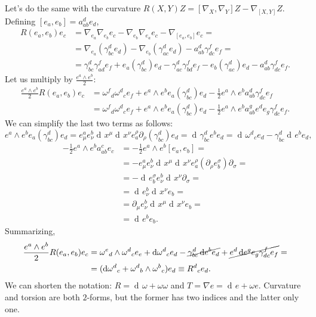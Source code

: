 \documentclass[a4paper,12pt]{book}
\newcommand{\dd}{\mathop{\mathrm{d}\!}{}}
\theoremstyle{definition}
\theoremstyle{remark}
\begin{document}
Let's do the same with the curvature $R(X,Y)Z=[\nabla_X,\nabla_Y]Z-\nabla_{[X,Y]}Z$. Defining $[e_a,e_b]=a_{ab}^de_d$,
\begin{align*}
R(e_a,e_b)e_c&=\nabla_{e_a}\nabla_{e_b}e_c-\nabla_{e_b}\nabla_{e_a}e_c-\nabla_{[e_a,e_b]}e_c=\\
&=\nabla_{e_a}(\gamma_{bc}^de_d)-\nabla_{e_b}(\gamma_{ac}^de_d)-a_{ab}^d\gamma_{dc}^fe_f=\\
&=\gamma_{bc}^d\gamma_{ad}^fe_f+e_a(\gamma_{bc}^d)e_d-\gamma_{ac}^d\gamma_{bd}^fe_f-e_b(\gamma_{ac}^d)e_d-a_{ab}^d\gamma_{dc}^fe_f.
\end{align*}
Let us multiply by $\frac{e^a\wedge e^b}{2}$:
\begin{align*}
\frac{e^a\wedge e^b}{2}R(e_a,e_b)e_c&=\omega^f{}_d\omega^d{}_ce_f+e^a\wedge e^b e_a(\gamma_{bc}^d)e_d-\frac{1}{2}e^a\wedge e^b a_{ab}^d\gamma_{dc}^fe_f\\
&=\omega^f{}_d\omega^d{}_ce_f+e^a\wedge e^b e_a(\gamma_{bc}^d)e_d-\frac{1}{2}e^a\wedge e^b a_{ab}^ge^de_g\gamma_{dc}^fe_f.
\end{align*}
We can simplify the last two terms as follows:
\[e^a\wedge e^b e_a(\gamma_{bc}^d)e_d=e_\mu^ae_\nu^b\dd x^\mu\dd x^\nu e^\rho_a\partial_\rho(\gamma_{bc}^d)e_d=\dd\gamma_{bc}^de^be_d=\dd\omega^d{}_ce_d-\gamma_{bc}^d\dd e^be_d,\]
\begin{align*}
-\frac{1}{2}e^a\wedge e^b a_{ab}^c e_c&=-\frac{1}{2}e^a\wedge e^b[e_a,e_b]=\\
&=-e_\mu^ae_\nu^b\dd x^\mu\dd x^\nu e^\rho_a(\partial_\rho e^\sigma_b)\partial_\sigma=\\
&=-\dd e^\sigma_be^b_\nu\dd x^\nu\partial_\sigma=\\
&=\dd e^b_\nu\dd x^\nu e_b=\\
&=\partial_\mu e^b_\nu\dd x^\mu\dd x^\nu e_b=\\
&=\dd e^b e_b.
\end{align*}
Summarizing,
\begin{align*}
\frac{e^a\wedge e^b}{2}R(e_a,e_b)e_c&=\omega^e{}_d\wedge\omega^d{}_ce_e+\dd\omega^d{}_ce_d-\cancel{\gamma_{bc}^d\dd e^be_d}+\cancel{e^d\dd e^ge_g\gamma_{dc}^fe_f}=\\
&=(\dd\omega^d{}_c+\omega^d{}_b\wedge\omega^b{}_c)e_d\equiv R^d{}_ce_d.
\end{align*}
We can shorten the notation: $R=\dd\omega+\omega\omega$ and $T=\nabla e=\dd e+\omega e$. Curvature and torsion are both $2$-forms, but the former has two indices and the latter only one.
\end{document}
